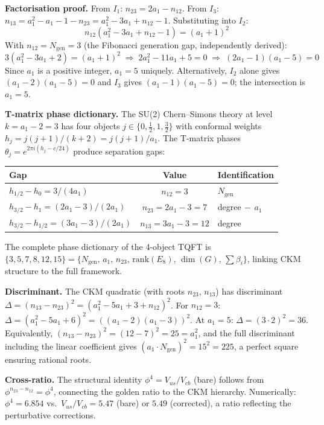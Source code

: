 \documentclass[12pt,a4paper]{article}
\theoremstyle{definition}
\begin{document}
\textbf{Factorisation proof.}  From $I_1$: $n_{23} = 2a_1 - n_{12}$.  From $I_3$: $n_{13} = a_1^2 - a_1 - 1 - n_{23} = a_1^2 - 3a_1 + n_{12} - 1$.  Substituting into $I_2$:
\begin{equation}
n_{12}(a_1^2 - 3a_1 + n_{12} - 1) = (a_1+1)^2
\end{equation}
With $n_{12} = N_{\text{gen}} = 3$ (the Fibonacci generation gap, independently derived):
\[
3(a_1^2 - 3a_1 + 2) = (a_1+1)^2 \;\Longrightarrow\; 2a_1^2 - 11a_1 + 5 = 0 \;\Longrightarrow\; (2a_1 - 1)(a_1 - 5) = 0
\]
Since $a_1$ is a positive integer, $a_1 = 5$ uniquely.  Alternatively, $I_2$ alone gives $(a_1-2)(a_1-5) = 0$ and $I_3$ gives $(a_1-1)(a_1-5) = 0$; the intersection is $a_1 = 5$.

\textbf{T-matrix phase dictionary.}  The SU(2) Chern--Simons theory at level $k = a_1 - 2 = 3$ has four objects $j \in \{0, \tfrac{1}{2}, 1, \tfrac{3}{2}\}$ with conformal weights $h_j = j(j+1)/(k+2) = j(j+1)/a_1$.  The T-matrix phases $\theta_j = e^{2\pi i(h_j - c/24)}$ produce separation gaps:
\begin{center}
\begin{tabular}{lcl}
\toprule
\textbf{Gap} & \textbf{Value} & \textbf{Identification} \\
\midrule
$h_{1/2} - h_0 = 3/(4a_1)$ & $n_{12} = 3$ & $N_{\text{gen}}$ \\
$h_{3/2} - h_1 = (2a_1-3)/(2a_1)$ & $n_{23} = 2a_1-3 = 7$ & degree$\,-\,a_1$ \\
$h_{3/2} - h_{1/2} = (3a_1-3)/(2a_1)$ & $n_{13} = 3a_1-3 = 12$ & degree \\
\bottomrule
\end{tabular}
\end{center}
The complete phase dictionary of the 4-object TQFT is $\{3, 5, 7, 8, 12, 15\} = \{N_{\text{gen}},\, a_1,\, n_{23},\, \mathrm{rank}(E_8),\, \dim(G),\, \sum\beta_i\}$, linking CKM structure to the full framework.

\textbf{Discriminant.}  The CKM quadratic (with roots $n_{23}$, $n_{13}$) has discriminant $\Delta = (n_{13} - n_{23})^2 = (a_1^2 - 5a_1 + 3 + n_{12})^2$.  For $n_{12} = 3$: $\Delta = (a_1^2 - 5a_1 + 6)^2 = ((a_1-2)(a_1-3))^2$.  At $a_1 = 5$: $\Delta = (3 \cdot 2)^2 = 36$.  Equivalently, $(n_{13} - n_{23})^2 = (12-7)^2 = 25 = a_1^2$, and the full discriminant including the linear coefficient gives $(a_1 \cdot N_{\text{gen}})^2 = 15^2 = 225$, a perfect square ensuring rational roots.

\textbf{Cross-ratio.}  The structural identity $\phi^4 = V_{us}/V_{cb}$ (bare) follows from $\phi^{n_{23} - n_{12}} = \phi^4$, connecting the golden ratio to the CKM hierarchy.  Numerically: $\phi^4 = 6.854$ vs.\ $V_{us}/V_{cb} = 5.47$ (bare) or $5.49$ (corrected), a ratio reflecting the perturbative corrections.
\end{document}
